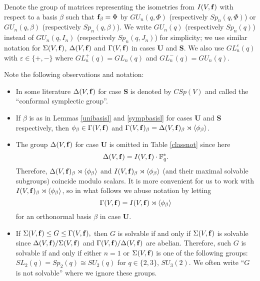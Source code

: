  Denote the group of matrices representing the isometries from $I(V, {\bf f})$ with respect to a basis $\beta$ such that ${\bf f}_{\beta}=\Phi$ by $GU_n(q,\Phi)$ (respectively $Sp_n(q,\Phi)$)  or $GU_n(q, \beta)$ (respectively $Sp_n(q, \beta)$).  We write  $GU_n(q)$ (respectively $Sp_n(q)$) instead of $GU_n(q, I_n)$ (respectively $Sp_n(q, J_n)$) for simplicity; we use similar notation for $\Sigma(V, {\bf f})$, $\Delta(V, {\bf f})$ and $\Gamma(V, {\bf f})$ in cases {\bf U} and {\bf S}. We also use $GL_n^{\varepsilon}(q)$ with $\varepsilon \in \{+, -\}$ where $GL_n^+(q)=GL_n(q)$ and $GL_n^-(q)=GU_n(q).$ 

\medskip

Note the following observations and notation:
\begin{itemize}
\item In some literature $\Delta(V, {\bf f})$ for case {\bf S} is denoted by $CSp(V)$ and called the ``conformal symplectic group''.
\item If $\beta$ is as in Lemmas \ref{unibasisl} and \ref{sympbasisl} for cases {\bf U} and {\bf S} respectively, then $\phi_{\beta} \in \Gamma(V, {\bf f})$ and $\Gamma(V, {\bf f})_{\beta}= \Delta(V, \bf{f})_{\beta} \rtimes \langle \phi_{\beta} \rangle$. 
\item The group   $\Delta(V, {\bf f})$ for case {\bf U} is omitted in Table \ref{classnot} since here $$\Delta(V, {\bf f})=I(V, {\bf f}) \cdot \mathbb{F}_q^*.$$ Therefore, 
  $\Delta(V, \bf{f})_{\beta} \rtimes \langle \phi_{\beta} \rangle$ and $I(V, \bf{f})_{\beta} \rtimes \langle \phi_{\beta} \rangle$ (and their maximal solvable subgroups) coincide modulo scalars. It is more convenient for us to work with $I(V, \bf{f})_{\beta} \rtimes \langle \phi_{\beta} \rangle$, so in what follows we abuse notation by letting   $$\Gamma(V, {\bf f})= I(V, {\bf f}) \rtimes \langle \phi_{\beta}\rangle$$
for an orthonormal basis $\beta$ in case {\bf U}.
\item If $\Sigma(V, {\bf f}) \le G \le \Gamma(V, {\bf f}),$ then $G$ is solvable if and only if $\Sigma(V, {\bf f})$ is solvable since $\Delta(V, {\bf f})/\Sigma(V, {\bf f})$ and $\Gamma(V, {\bf f})/\Delta(V, {\bf f})$ are abelian. Therefore, such $G$ is solvable if and only if either $n=1$ or  $\Sigma(V, {\bf f})$ is one of the following groups: $SL_2(q)=Sp_2(q)\cong SU_2(q) $ for $q \in \{2,3\}$,   $SU_3(2).$ 
We often write ``$G$ is not solvable'' where we ignore these groups.
\end{itemize}










